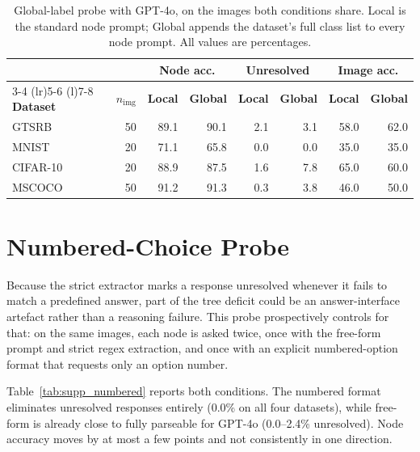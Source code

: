 \documentclass[10pt,twocolumn,letterpaper]{article}
\begin{document}
\begin{table}[t]
\centering
\caption{Global-label probe with GPT-4o, on the images both conditions share. Local is the standard node prompt; Global appends the dataset's full class list to every node prompt. All values are percentages.}
\label{tab:supp_global}
\footnotesize
\setlength{\tabcolsep}{4pt}
\begin{tabular}{@{}lrrrrrrr@{}}
\toprule
& & \multicolumn{2}{c}{\textbf{Node acc.}} & \multicolumn{2}{c}{\textbf{Unresolved}} & \multicolumn{2}{c}{\textbf{Image acc.}} \\
\cmidrule(lr){3-4} \cmidrule(lr){5-6} \cmidrule(l){7-8}
\textbf{Dataset} & $n_{\text{img}}$ & \textbf{Local} & \textbf{Global} & \textbf{Local} & \textbf{Global} & \textbf{Local} & \textbf{Global} \\
\midrule
GTSRB     & 50 & 89.1 & 90.1 & 2.1 & 3.1 & 58.0 & 62.0 \\
MNIST     & 20 & 71.1 & 65.8 & 0.0 & 0.0 & 35.0 & 35.0 \\
CIFAR-10  & 20 & 88.9 & 87.5 & 1.6 & 7.8 & 65.0 & 60.0 \\
MSCOCO    & 50 & 91.2 & 91.3 & 0.3 & 3.8 & 46.0 & 50.0 \\
\bottomrule
\end{tabular}
\end{table}


\section{Numbered-Choice Probe}
\label{sec:supp_numbered}

Because the strict extractor marks a response unresolved whenever it fails to
match a predefined answer, part of the tree deficit could be an
answer-interface artefact rather than a reasoning failure. This probe
prospectively controls for that: on the same images, each node is asked twice,
once with the free-form prompt and strict regex extraction, and once with an
explicit numbered-option format that requests only an option number.

Table~\ref{tab:supp_numbered} reports both conditions. The numbered format
eliminates unresolved responses entirely (0.0\% on all four datasets), while
free-form is already close to fully parseable for GPT-4o (0.0--2.4\%
unresolved). Node accuracy moves by at most a few points and not consistently
in one direction.
\end{document}

